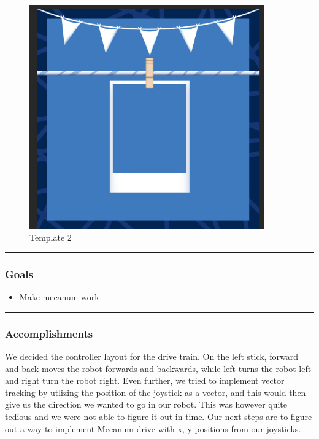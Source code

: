 \begin{figure}[htp]
\centering
\includegraphics[width=0.9\textwidth, angle=0]{Meetings/August/08-24-21/2.PNG}
\caption{Template 2}
\label{fig:082421_2}
\end{figure}

\noindent\hfil\rule{\textwidth}{.4pt}\hfil
\subsubsection{Goals}
\begin{itemize}
    \item Make mecanum work

\end{itemize} 

\noindent\hfil\rule{\textwidth}{.4pt}\hfil

\subsubsection*{Accomplishments}
We decided the controller layout for the drive train. On the left stick, forward and back moves the robot forwards and backwards, while left turns the robot left and right turn the robot right. Even further, we tried to implement vector tracking by utlizing the position of the joystick as a vector, and this would then give us the direction we wanted to go in our robot. This was however quite tedious and we were not able to figure it out in time. Our next steps are to figure out a way to implement Mecanum drive with x, y positions from our joysticks.

